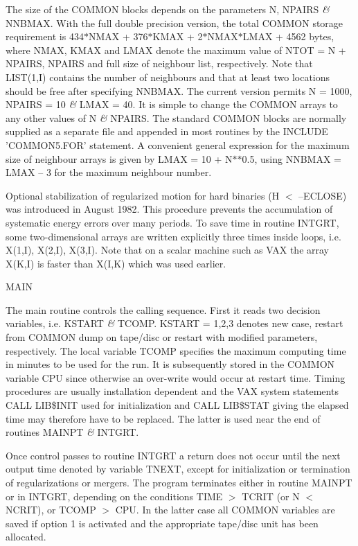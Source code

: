  The size of the COMMON blocks depends on the parameters N,
 NPAIRS {\it\&} NNBMAX.  With
          the full double precision version, the total COMMON storage
 requirement is 434$\ast$NMAX + 376$\ast$KMAX + 2$\ast$NMAX$\ast$LMAX + 4562
 bytes, where NMAX, KMAX and LMAX denote the maximum value of
 NTOT = N + NPAIRS, NPAIRS and full size of neighbour list, respectively.
 Note that LIST(1,I) contains
 the number of neighbours and that at least two locations should be free after
  specifying NNBMAX.  The current version permits N = 1000, NPAIRS = 10
  {\it\&} LMAX = 40.  It is simple
 to change the COMMON arrays to any other values of N {\it\&} NPAIRS.  
 The standard COMMON blocks are normally supplied as a separate
 file and appended in most routines by the INCLUDE 'COMMON5.FOR'
 statement. A convenient general
 expression for the maximum size of neighbour arrays is given by 
 LMAX = 10 + N$\ast$$\ast$0.5, using NNBMAX = LMAX -- 3 for the maximum neighbour number.

 Optional stabilization of regularized motion for hard binaries (H $<$ --ECLOSE)
  was introduced in August 1982.  This procedure prevents the accumulation of
 systematic energy errors over many periods.  To save
         time in routine INTGRT, some two-dimensional arrays are written
 explicitly three times inside loops, i.e. X(1,I), X(2,I), X(3,I).  Note that
 on a scalar machine such as VAX the array
 X(K,I) is faster than X(I,K) which was used earlier.
\bigskip
\bigskip
\centerline {MAIN}
\bigskip

 The main routine controls the calling sequence.  First it reads
 two decision variables, i.e. KSTART {\it\&} TCOMP.  KSTART = 1,2,3 denotes new case,
 restart from COMMON dump on tape/disc or restart with modified parameters,
 respectively.  The local variable TCOMP specifies the maximum computing time
 in minutes to be used for the run.  It is subsequently stored in the COMMON
 variable CPU since otherwise an over-write would occur at
 restart time.  Timing
 procedures are usually installation dependent and the VAX system statements
 CALL LIB\$INIT used for initialization and CALL LIB\$STAT giving the elapsed
 time may therefore have to be replaced.  The latter is used near the end
 of routines MAINPT {\it\&} INTGRT.

 Once control passes to routine
 INTGRT a return does not occur until the next output time denoted by variable
 TNEXT, except for initialization or termination of regularizations
 or mergers.  The
 program terminates either in routine MAINPT or in INTGRT, depending
 on the conditions TIME $>$ TCRIT (or N $<$ NCRIT), or TCOMP $>$ CPU.  In the latter case
 all COMMON variables are saved if option 1 is activated and the appropriate
 tape/disc unit has been allocated.

